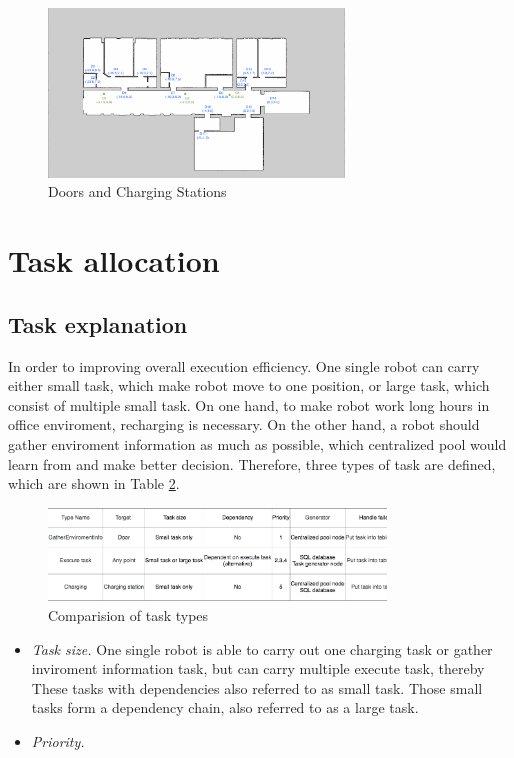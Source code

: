 \begin{figure}[htbp]
	\centering
	\includegraphics[width = 0.7\textwidth]{content/images/ch3/positions_door_station.png}
	\caption{Doors and Charging Stations}
	\label{fig:positions_door_station}
\end{figure}

\section{Task allocation}

\subsection{Task explanation}
\label{sec:task_explanation}
In order to improving overall execution efficiency. One single robot can carry either small task, which make robot move to one position, or large task, which consist of multiple small task.
On one hand, to make robot work long hours in office enviroment, recharging is necessary. On the other hand, a robot should gather enviroment information as much as possible, which centralized pool would learn from and make better decision. 
Therefore, three types of task are defined, which are shown in Table \ref{fig:task_types}. 

\begin{figure}[htb]
	\centering
	\includegraphics[width = 0.8\textwidth]{content/images/ch3/task_types.drawio.png}
	\caption{Comparision of task types }
	\label{fig:task_types}
\end{figure}

\begin{itemize}
	\item \textsl{Task size.} One single robot is able to carry out one charging task or gather inviroment information task, but can carry multiple execute task, thereby 
	These tasks with dependencies also referred to as small task. Those small tasks form a dependency chain, also referred to as a large task.
	\item \textsl{Priority.}
\end{itemize}

